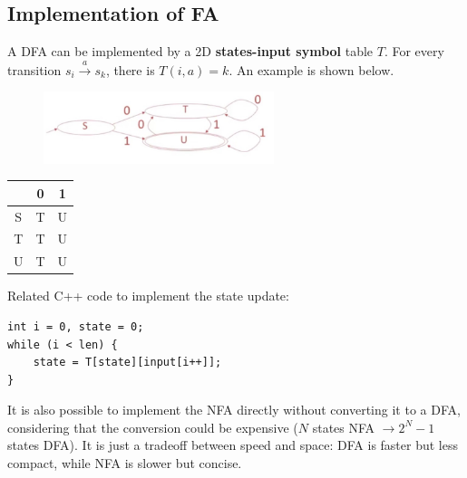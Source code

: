\subsection{Implementation of FA}
A DFA can be implemented by a 2D {\bf states-input symbol} table $T$. For every transition $s_i\xrightarrow{a}s_k$, there is $T(i,a) = k$. An example is shown below.
\begin{figure}[H]
\centering
\includegraphics[width=0.6\textwidth]{dfaimpl.jpg}
\end{figure}
\begin{table}[H]
\centering
\begin{tabular}{c|cc}
  & 0 & 1\\\hline
S & T & U\\
T & T & U\\
U & T & U
\end{tabular}
\end{table}
Related C++ code to implement the state update:
\begin{lstlisting}
int i = 0, state = 0;
while (i < len) {
	state = T[state][input[i++]];
} 
\end{lstlisting}
It is also possible to implement the NFA directly without converting it to a DFA, considering that the conversion could be expensive ($N$ states NFA $\rightarrow 2^N-1$ states DFA). It is just a tradeoff between speed and space: DFA is faster but less compact, while NFA is slower but concise.
\ifx\PREAMBLE\undefined

\fi